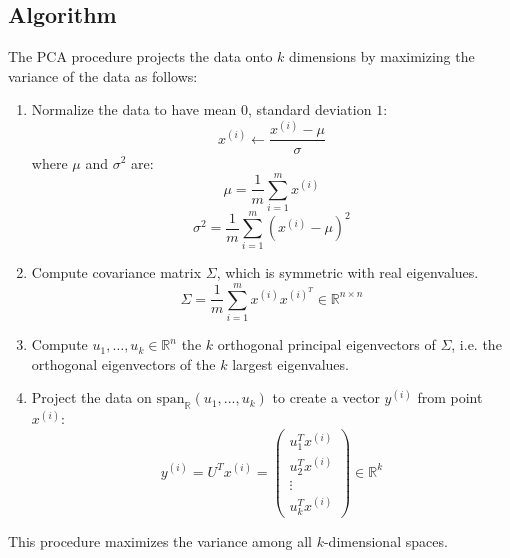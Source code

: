 \documentclass[twoside,twocolumn]{article}
\begin{document}
\subsection{Algorithm}
The PCA procedure projects the data onto $k$ dimensions by maximizing the variance
of the data as follows:
\begin{enumerate}
  \item Normalize the data to have mean $0$, standard deviation $1$:
    \begin{equation} x^{(i)}\leftarrow\frac{x^{(i)}-\mu}{\sigma} \end{equation}
      where $\mu$ and $\sigma^2$ are:
      \begin{equation} \mu = \frac{1}{m}\sum_{i=1}^mx^{(i)} \end{equation}
      \begin{equation} \sigma^2=\frac{1}{m}\sum_{i=1}^m(x^{(i)}-\mu)^2 \end{equation}
  \item Compute covariance matrix $\Sigma$, which is symmetric with real eigenvalues.
    \begin{equation} \Sigma = \frac{1}{m}\sum_{i=1}^m x^{(i)}x^{(i)^T} \in \mathbb{R}^{n \times n} \end{equation}
  \item Compute $u_1, \hdots, u_k \in \mathbb{R}^{n}$ the $k$ orthogonal principal
    eigenvectors of $\Sigma$, i.e. the orthogonal eigenvectors of the $k$
    largest eigenvalues.
  \item Project the data on $\textrm{span}_\mathbb{R}(u_1,...,u_k)$ to create
    a vector $y^{(i)}$ from point $x^{(i)}$:
    \begin{equation} y^{(i)} = U^T x^{(i)} = \left( \begin{array} { c } { u _ { 1 } ^ { T } x ^ { ( i ) } } \\ { u _ { 2 } ^ { T } x ^ { ( i ) } } \\ { \vdots } \\ { u _ { k } ^ { T } x ^ { ( i ) } } \end{array} \right) \in \mathbb { R } ^ { k } \end{equation}
\end{enumerate}
This procedure maximizes the variance among all $k$-dimensional spaces.
\end{document}
